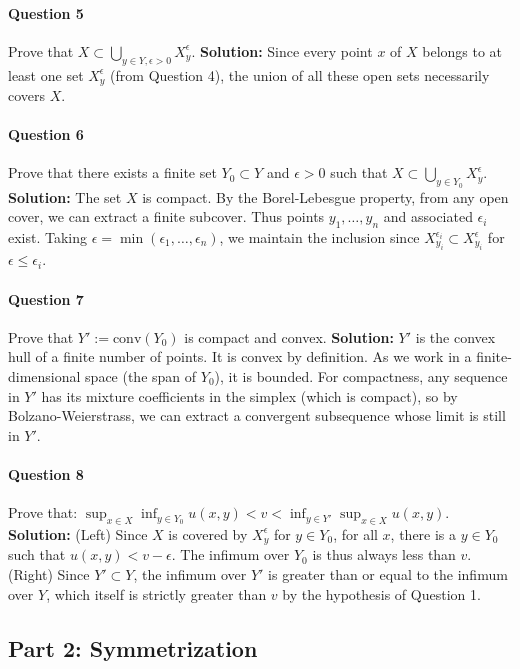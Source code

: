 \paragraph{Question 5} Prove that $X \subset \bigcup_{y \in Y, \epsilon > 0} X_y^\epsilon$.
\textbf{Solution:} Since every point $x$ of $X$ belongs to at least one set $X_y^\epsilon$ (from Question 4), the union of all these open sets necessarily covers $X$.

\paragraph{Question 6} Prove that there exists a finite set $Y_0 \subset Y$ and $\epsilon > 0$ such that $X \subset \bigcup_{y \in Y_0} X_y^\epsilon$.
\textbf{Solution:} The set $X$ is compact. By the Borel-Lebesgue property, from any open cover, we can extract a finite subcover. Thus points $y_1, \dots, y_n$ and associated $\epsilon_i$ exist. Taking $\epsilon = \min(\epsilon_1, \dots, \epsilon_n)$, we maintain the inclusion since $X_{y_i}^{\epsilon_i} \subset X_{y_i}^{\epsilon}$ for $\epsilon \leq \epsilon_i$.

\paragraph{Question 7} Prove that $Y' := \text{conv}(Y_0)$ is compact and convex.
\textbf{Solution:} $Y'$ is the convex hull of a finite number of points. It is convex by definition. As we work in a finite-dimensional space (the span of $Y_0$), it is bounded. For compactness, any sequence in $Y'$ has its mixture coefficients in the simplex (which is compact), so by Bolzano-Weierstrass, we can extract a convergent subsequence whose limit is still in $Y'$.

\paragraph{Question 8} Prove that: $\sup_{x \in X} \inf_{y \in Y_0} u(x,y) < v < \inf_{y \in Y'} \sup_{x \in X} u(x,y)$.
\textbf{Solution:}
(Left) Since $X$ is covered by $X_y^\epsilon$ for $y \in Y_0$, for all $x$, there is a $y \in Y_0$ such that $u(x,y) < v - \epsilon$. The infimum over $Y_0$ is thus always less than $v$.
(Right) Since $Y' \subset Y$, the infimum over $Y'$ is greater than or equal to the infimum over $Y$, which itself is strictly greater than $v$ by the hypothesis of Question 1.

\subsection{Part 2: Symmetrization}

